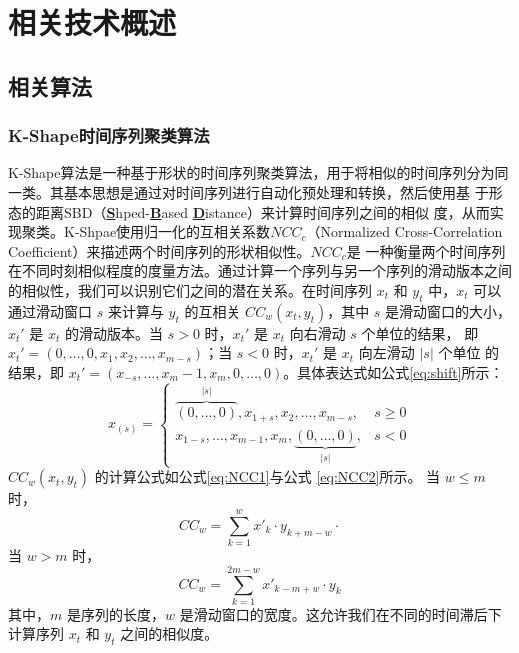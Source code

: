 \chapter{相关技术概述}
\section{相关算法}
\subsection{K-Shape时间序列聚类算法}
\label{section2.1.1}
K-Shape算法\cite{yang2017k}是一种基于形状的时间序列聚类算法，用于将相似的时间序列分为同一类。其基本思想是通过对时间序列进行自动化预处理和转换，然后使用基
于形态的距离SBD（\textbf{\underline{S}}hped-\textbf{\underline{B}}ased \textbf{\underline{D}}istance）来计算时间序列之间的相似
度，从而实现聚类。K-Shpae使用归一化的互相关系数$NCC_{c}$（Normalized Cross-Correlation Coefficient）来描述两个时间序列的形状相似性。$NCC_{c}$是
一种衡量两个时间序列在不同时刻相似程度的度量方法。通过计算一个序列与另一个序列的滑动版本之间的相似性，我们可以识别它们之间的潜在关系。在时间序列 \( x_t \) 
和 \( y_t \) 中，\( x_t \) 可以通过滑动窗口 \( s \) 来计算与 \( y_t \) 的互相关 \( CC_w(x_t, y_t) \)，其中 \( s \) 是滑动窗口的大小，
\( x_t' \) 是 \( x_t \) 的滑动版本。当 \( s > 0 \) 时，\( x_t' \) 是 \( x_t \) 向右滑动 \( s \) 个单位的结果，
即 \( x_t' = (0, \ldots, 0, x_1, x_2, \ldots, x_{m-s}) \)；当 \( s < 0 \) 时，\( x_t' \) 是 \( x_t \) 向左滑动 \( |s| \) 个单位
的结果，即 \( x_t' = (x_{-s}, \ldots, x_m - 1, x_m, 0, \ldots, 0) \)。具体表达式如公式\eqref{eq:shift}所示：
\begin{equation}
    x_(s) = 
        \begin{cases} 
        \overbrace{(0, \ldots, 0)}^{|s|}, x_{1+s}, x_2, \ldots, x_{m-s}, & s \geq 0 \\
        x_{1-s}, \ldots, x_{m-1}, x_m, \underbrace{(0, \ldots, 0)}_{|s|}, & s < 0 
        \end{cases}
    \label{eq:shift}
\end{equation}
\( CC_w(x_t, y_t) \) 的计算公式如公式\eqref{eq:NCC1}与公式
\eqref{eq:NCC2}所示。
当 \( w \leq m \) 时，
\begin{equation}
CC_w = \sum_{k=1}^w x'_k \cdot y_{k+m-w}
\label{eq:NCC1}·
\end{equation}
当 \( w > m \) 时，
\begin{equation}
CC_w = \sum_{k=1}^{2m-w} x'_{k-m+w} \cdot y_k
\label{eq:NCC2}
\end{equation}
其中，\( m \) 是序列的长度，\( w \) 是滑动窗口的宽度。这允许我们在不同的时间滞后下计算序列 \( x_t \) 和 \( y_t \) 之间的相似度。
